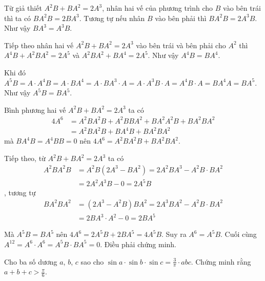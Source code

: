 \begin{solution}
    Từ giả thiết $A^2 B + B A^2 = 2A^3$, nhân hai vế của phương
    trình cho $B$ vào bên trái thì ta có $B A^2 B = 2BA^3$. Tương
    tự nếu nhân $B$ vào bên phải thì $B A^2 B = 2A^3 B$. Như vậy
    $BA^3 = A^3 B$.

    Tiếp theo nhân hai vế $A^2 B + B A^2 = 2A^3$ vào bên trái và bên
    phải cho $A^2$ thì $A^4 B + A^2 B A^2 = 2A^5$ và $A^2 B A^2 
    + BA^4 = 2A^5$. Như vậy $A^4 B = B A^4$.

    Khi đó $A^5 B = A \cdot A^4 B = A \cdot BA^4 
    = A \cdot BA^3 \cdot A = A \cdot A^3 B \cdot A 
    = A^4 B \cdot A = B A^4 A = B A^5$. Như vậy $A^5 B = B A^5$.

    Bình phương hai vế $A^2 B + BA^2 = 2A^3$ ta có
    \begin{align*}
        4A^6 & = A^2 B A^2 B + A^2B BA^2 + BA^2 A^2 B + BA^2 BA^2 \\
            & = A^2 B A^2 B + BA^4 B + BA^2 BA^2
    \end{align*}
    mà $BA^4B = A^4 B B = 0$ nên $4A^6 = A^2B A^2B + BA^2 BA^2$.

    Tiếp theo, từ $A^2 B + BA^2 = 2A^3$ ta có
    \begin{align*}
        A^2B A^2B & = A^2B (2A^3 - BA^2) = 2 A^2 B A^3 - A^2 B \cdot BA^2
                \\ & = 2 A^2 A^3 B - 0 = 2 A^5 B
    \end{align*}
    , tương tự
    \begin{align*}
        BA^2 BA^2 & = (2A^3 - A^2B) BA^2 = 2A^3 BA^2 - A^2B \cdot BA^2
                \\ & = 2 BA^3 \cdot A^2 - 0 = 2BA^5
    \end{align*}

    Mà $A^5 B = BA^5$ nên $4A^6 = 2A^5B + 2BA^5 = 4A^5B$. Suy ra
    $A^6 = A^5 B$. Cuối cùng $A^{12} = A^6 \cdot A^6 = A^5B \cdot BA^5
    = 0$. Điều phải chứng minh.
\end{solution}

\begin{problem}{8}
    Cho ba số dương $a$, $b$, $c$ sao cho $\sin a \cdot \sin b \cdot
    \sin c = \frac{3}{\pi} \cdot abc$. Chứng minh rằng 
    $a + b + c > \frac{\pi}{6}$.
\end{problem}

